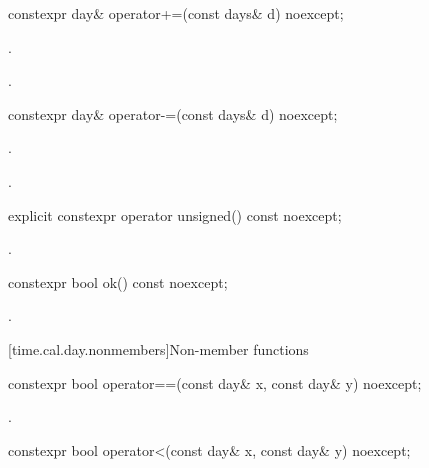 %
\begin{itemdecl}
constexpr day& operator+=(const days& d) noexcept;
\end{itemdecl}

\begin{itemdescr}
\pnum
\effects {}.

\pnum
\returns {}.
\end{itemdescr}

%
\begin{itemdecl}
constexpr day& operator-=(const days& d) noexcept;
\end{itemdecl}

\begin{itemdescr}
\pnum
\effects {}.

\pnum
\returns {}.
\end{itemdescr}

%
\begin{itemdecl}
explicit constexpr operator unsigned() const noexcept;
\end{itemdecl}

\begin{itemdescr}
\pnum
\returns {}.
\end{itemdescr}

%
\begin{itemdecl}
constexpr bool ok() const noexcept;
\end{itemdecl}

\begin{itemdescr}
\pnum
\returns {}.
\end{itemdescr}

[time.cal.day.nonmembers]{Non-member functions}

%
\begin{itemdecl}
constexpr bool operator==(const day& x, const day& y) noexcept;
\end{itemdecl}

\begin{itemdescr}
\pnum
\returns {}.
\end{itemdescr}

%
\begin{itemdecl}
constexpr bool operator<(const day& x, const day& y) noexcept;
\end{itemdecl}

